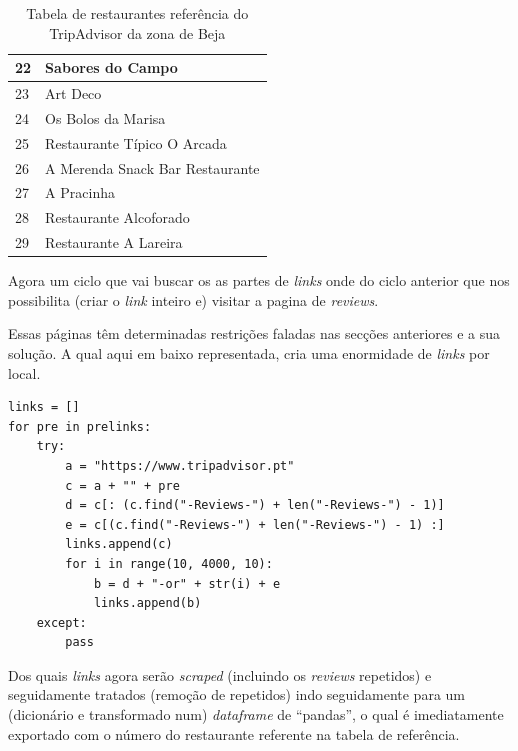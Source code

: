 \documentclass[a4paper,10pt]{article}
\begin{document}
\begin{table}[!ht]
\begin{tabular}{|l|l|}
    22 & Sabores do Campo                              \\ \hline
    23 & Art Deco                                      \\ \hline
    24 & Os Bolos da Marisa                            \\ \hline
    25 & Restaurante Típico O Arcada                   \\ \hline
    26 & A Merenda Snack Bar Restaurante               \\ \hline
    27 & A Pracinha                                    \\ \hline
    28 & Restaurante Alcoforado                        \\ \hline
    29 & Restaurante A Lareira                         \\ \hline
  \end{tabular}
  \caption{Tabela de restaurantes referência do TripAdvisor da zona de Beja}
\end{table}

Agora um ciclo que vai buscar os as partes de \textit{links} onde do ciclo anterior que nos possibilita (criar o \textit{link} inteiro e) visitar a pagina de \textit{reviews}.

Essas páginas têm determinadas restrições faladas nas secções anteriores e a sua solução. A qual aqui em baixo representada, cria uma enormidade de \textit{links} por local.

\begin{verbatim}
links = []
for pre in prelinks:
    try:
        a = "https://www.tripadvisor.pt"
        c = a + "" + pre
        d = c[: (c.find("-Reviews-") + len("-Reviews-") - 1)]
        e = c[(c.find("-Reviews-") + len("-Reviews-") - 1) :]
        links.append(c)
        for i in range(10, 4000, 10):
            b = d + "-or" + str(i) + e
            links.append(b)
    except:
        pass
\end{verbatim}

\newpage

Dos quais \textit{links} agora serão \textit{scraped} (incluindo os \textit{reviews} repetidos) e seguidamente tratados (remoção de repetidos) indo seguidamente para um (dicionário e transformado num) \textit{dataframe} de ``pandas'', o qual é imediatamente exportado com o número do restaurante referente na tabela de referência.
\end{document}
